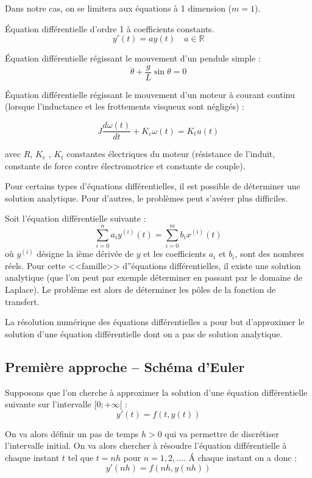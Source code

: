 \documentclass[10pt]{article}
\begin{document}
\begin{rem}
Dans notre cas, on se limitera aux équations à 1 dimension ($m=1$).
\end{rem}
\begin{exemple}
Équation différentielle d'ordre 1 à coefficients constants. 
$$
y'(t)=ay(t)\quad a\in \mathbb{R}
$$

Équation différentielle régissant le mouvement d'un pendule simple :
$$
\ddot{\theta} + \dfrac{g}{L}\sin\theta=0
$$

Équation différentielle régissant le mouvement d'un moteur à courant continu (lorsque l'inductance et les frottements visqueux sont négligés) :

$$
J \dfrac{d\omega(t)}{dt} + K_e\omega(t)=  K_t u(t)
$$

avec $R$, $K_e$ , $K_t$ constantes électriques du moteur (résistance de l’induit,
constante de force contre électromotrice et constante de couple).
\end{exemple}

Pour certains types d'équations différentielles, il est possible de déterminer une solution analytique. Pour d'autres, le problèmes peut s'avérer plus difficiles. 
\begin{exemple}
Soit l'équation différentielle suivante :
$$
\sum\limits_{i=0}^n a_i y^{(i)}(t) = \sum\limits_{i=0}^m b_i x^{(i)}(t)
$$
où $y^{(i)}$ désigne la ième dérivée de $y$ et les coefficients $a_i$ et $b_i$, sont des nombres réels. Pour cette <<famille>> d''équations différentielles, il existe une solution analytique (que l'on peut par exemple déterminer en passant par le domaine de Laplace). Le problème est alors de déterminer les pôles de la fonction de transfert.
\end{exemple}

La résolution numérique des équations différentielles a pour but d'approximer le solution d'une équation différentielle dont on a pas de solution analytique.

\subsection{Première approche -- Schéma d'Euler}

Supposons que l'on cherche à approximer la solution d'une équation différentielle suivante sur l'intervalle $[0;+\infty[$ :
$$
y'(t)=f(t,y(t))
$$ 

On va alors définir un pas de temps $h>0$ qui va permettre de discrétiser l'intervalle initial. On va alors chercher à résoudre l'équation différentielle à chaque instant $t$ tel que $t=nh$ pour $n=1,2,...$. \'A chaque instant on a donc : 
$$
y'(nh)=f(nh,y(nh))
$$ 
\end{document}
